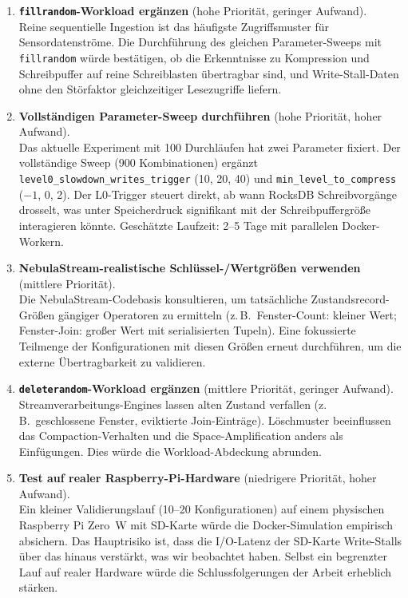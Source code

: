 \documentclass[11pt,a4paper]{scrartcl}
\begin{document}
\begin{enumerate}

  \item \textbf{\texttt{fillrandom}-Workload ergänzen} (hohe Priorität,
        geringer Aufwand).\\
        Reine sequentielle Ingestion ist das häufigste Zugriffsmuster für
        Sensordatenströme. Die Durchführung des gleichen Parameter-Sweeps mit
        \texttt{fillrandom} würde bestätigen, ob die Erkenntnisse zu
        Kompression und Schreibpuffer auf reine Schreiblasten übertragbar sind,
        und Write-Stall-Daten ohne den Störfaktor gleichzeitiger Lesezugriffe
        liefern.

  \item \textbf{Vollständigen Parameter-Sweep durchführen} (hohe Priorität,
        hoher Aufwand).\\
        Das aktuelle Experiment mit 100 Durchläufen hat zwei Parameter fixiert.
        Der vollständige Sweep (900 Kombinationen) ergänzt
        \texttt{level0\_slowdown\_writes\_trigger} (10, 20, 40) und
        \texttt{min\_level\_to\_compress} ($-1$, 0, 2). Der L0-Trigger steuert
        direkt, ab wann RocksDB Schreibvorgänge drosselt, was unter
        Speicherdruck signifikant mit der Schreibpuffergröße interagieren
        könnte. Geschätzte Laufzeit: 2--5 Tage mit parallelen Docker-Workern.

  \item \textbf{NebulaStream-realistische Schlüssel-/Wertgrößen verwenden}
        (mittlere Priorität).\\
        Die NebulaStream-Codebasis konsultieren, um tatsächliche
        Zustandsrecord-Größen gängiger Operatoren zu ermitteln (z.\,B.\
        Fenster-Count: kleiner Wert; Fenster-Join: großer Wert mit
        serialisierten Tupeln). Eine fokussierte Teilmenge der Konfigurationen
        mit diesen Größen erneut durchführen, um die externe Übertragbarkeit zu
        validieren.

  \item \textbf{\texttt{deleterandom}-Workload ergänzen} (mittlere Priorität,
        geringer Aufwand).\\
        Streamverarbeitungs-Engines lassen alten Zustand verfallen (z.\,B.\
        geschlossene Fenster, eviktierte Join-Einträge). Löschmuster
        beeinflussen das Compaction-Verhalten und die Space-Amplification anders
        als Einfügungen. Dies würde die Workload-Abdeckung abrunden.

  \item \textbf{Test auf realer Raspberry-Pi-Hardware} (niedrigere Priorität,
        hoher Aufwand).\\
        Ein kleiner Validierungslauf (10--20 Konfigurationen) auf einem
        physischen Raspberry Pi Zero~W mit SD-Karte würde die Docker-Simulation
        empirisch absichern. Das Hauptrisiko ist, dass die I/O-Latenz der
        SD-Karte Write-Stalls über das hinaus verstärkt, was wir beobachtet
        haben. Selbst ein begrenzter Lauf auf realer Hardware würde die
        Schlussfolgerungen der Arbeit erheblich stärken.


\end{enumerate}
\end{document}
